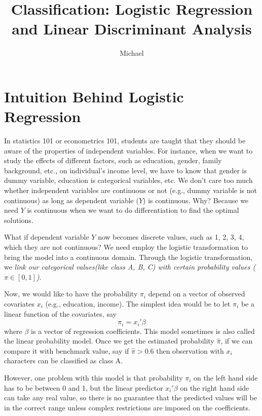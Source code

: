 \documentclass[12pt]{article}
\theoremstyle{definition}
\numberwithin{equation}{section}
\numberwithin{figure}{section}
\numberwithin{table}{section}
\begin{document}
\title{Classification: Logistic Regression and Linear Discriminant Analysis}
\author{Michael}
\date{}
\maketitle


\section{Intuition Behind Logistic Regression}

In statistics 101 or econometrics 101, students are taught that they should be aware of the properties of independent variables. For instance, when we want to study the effects of different factors, such as education, gender, family background, etc., on individual's income level, we have to know that gender is dummy variable, education is categorical variables, etc. We don't care too much whether independent variables are continuous or not (e.g., dummy variable is not continuous) as long as dependent variable ($Y$) is continuous. Why? Because we need $Y$ is continuous when we want to do differentiation to find the optimal solutions.

What if dependent variable $Y$ now becomes discrete values, such as 1, 2, 3, 4, which they are not continuous? We need employ the logistic transformation to bring the model into a continuous domain. Through the logistic transformation, we \textit{link our categorical values(like class A, B, C) with certain probability values ($\pi \in [0, 1]$)}.


Now, we would like to have the probability $\pi_i$ depend on a vector of observed covariates $x_i$ (e.g., education, income). The simplest idea would be to let $\pi_i$ be a linear function of the covariates, say
\begin{equation}
	\pi_i = x_i'\beta
\end{equation}
where $\beta$ is a vector of regression coefficients. This model sometimes is also called the linear probability model. Once we get the estimated probability $\hat{\pi}$, if we can compare it with benchmark value, say if $\hat{\pi} > 0.6$ then observation with $x_i$ characters can be classified as class A.

However, one problem with this model is that probability $\pi_i$ on the left hand side has to be between 0 and 1, but the linear predictor $x_i'\beta$ on the right hand side can take any real value, so there is no guarantee that the predicted values will be in the correct range unless complex restrictions are imposed on the coefficients.
\end{document}
